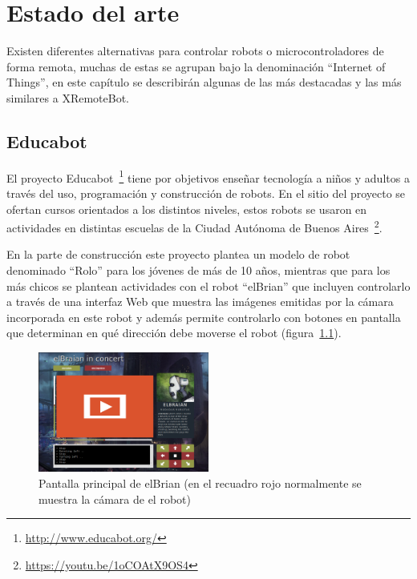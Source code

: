 \chapter{Estado del arte}
Existen diferentes alternativas para controlar robots o microcontroladores
de forma remota, muchas de estas se agrupan bajo la denominación
``Internet of Things'', en este capítulo se describirán algunas de las
más destacadas y las más similares a XRemoteBot.


\section{Educabot}
El proyecto Educabot~\footnote{\url{http://www.educabot.org/}} tiene por
objetivos enseñar tecnología a niños y adultos a través
del uso, programación y construcción de robots. En el sitio del proyecto
se ofertan cursos orientados a los distintos niveles, estos robots se
usaron en actividades en distintas escuelas de la Ciudad Autónoma de Buenos
Aires~\footnote{\url{https://youtu.be/1oCOAtX9OS4}}.


En la parte de construcción este proyecto plantea un modelo de robot denominado
``Rolo'' para los jóvenes de más de 10 años, mientras que para los más chicos
se plantean actividades con el robot ``elBrian'' que incluyen
controlarlo a través de una interfaz Web que muestra las imágenes emitidas
por la cámara incorporada en este robot y además permite controlarlo con
botones en pantalla que determinan en qué dirección debe moverse el robot
(figura~\ref{fig:elbrian}).

\begin{figure}
    \centering
    \includegraphics[width=0.5\textwidth]{figures/elbrian-1}
    \caption{Pantalla principal de elBrian (en el recuadro rojo normalmente
        se muestra la cámara de el robot)}
    \label{fig:elbrian}
\end{figure}

